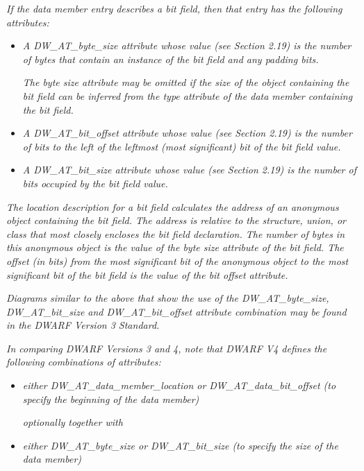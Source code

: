 \begin{myindentpara}{1cm}
\textit{If the data member entry describes a bit field, then that
entry has the following attributes:}

\begin{itemize}
\item \textit{A DW\_AT\_byte\_size attribute whose value (see Section
2.19) is the number of bytes that contain an instance of the
bit field and any padding bits.}

\textit{The byte size attribute may be omitted if the size of the
object containing the bit field can be inferred from the type
attribute of the data member containing the bit field.}

\item \textit{A DW\_AT\_bit\_offset attribute whose value (see Section
2.19) is the number of bits to the left of the leftmost
(most significant) bit of the bit field value.}

\item \textit{A DW\_AT\_bit\_size attribute whose value (see Section
2.19) is the number of bits occupied by the bit field value.}

\end{itemize}

\textit{The location description for a bit field calculates the address
of an anonymous object containing the bit field. The address
is relative to the structure, union, or class that most closely
encloses the bit field declaration. The number of bytes in this
anonymous object is the value of the byte size attribute of
the bit field. The offset (in bits) from the most significant
bit of the anonymous object to the most significant bit of
the bit field is the value of the bit offset attribute.}
\end{myindentpara}


\textit{Diagrams similar to the above that show the use of the
DW\-\_AT\-\_byte\-\_size, DW\-\_AT\-\_bit\-\_size and DW\-\_AT\-\_bit\-\_offset attribute
combination may be found in the DWARF Version 3 Standard.}

\textit{In comparing DWARF Versions 3 and 4, note that DWARF V4
defines the following combinations of attributes:}

\begin{itemize}
\item \textit{either DW\-\_AT\-\_data\-\_member\-\_location or
DW\-\_AT\-\_data\-\_bit\-\_offset (to specify the beginning of the
data member)}

\textit{optionally together with}

\item  \textit{either DW\_AT\_byte\_size or DW\-\_AT\-\_bit\-\_size (to
specify the size of the data member)}

\end{itemize}

